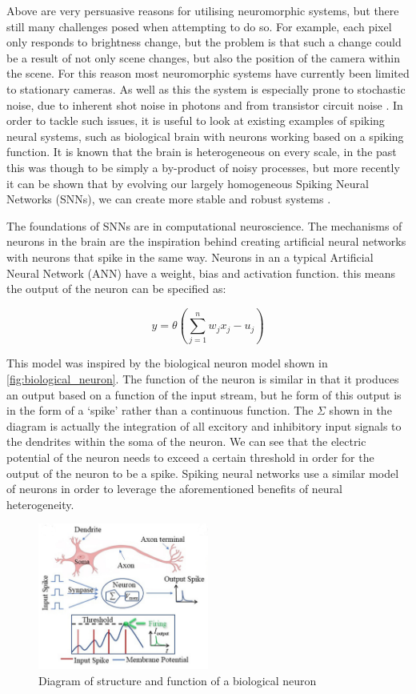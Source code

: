 Above are very persuasive reasons for utilising neuromorphic systems, but there still many challenges posed when attempting to do so. For example, each pixel only responds to brightness change, but the problem is that such a change could be a result of not only scene changes, but also the position of the camera within the scene. For this reason most neuromorphic systems have currently been limited to stationary cameras. As well as this the system is especially prone to stochastic noise, due to inherent shot noise in photons and from transistor circuit noise \cite{EventBasedVisionASurvery}. In order to tackle such issues, it is useful to look at existing examples of spiking neural systems, such as biological brain with neurons working based on a spiking function. It is known that the brain is heterogeneous on every scale, in the past this was though to be simply a by-product of noisy processes, but more recently it can be shown that by evolving our largely homogeneous Spiking Neural Networks (SNNs), we can create more stable and robust systems \cite{NeuralHetroPromRobLearn}.

The foundations of SNNs are in computational neuroscience. The mechanisms of neurons in the brain are the inspiration behind creating artificial neural networks with neurons that spike in the same way. Neurons in an a typical Artificial Neural Network (ANN) have a weight, bias and activation function. this means the output of the neuron can be specified as:

$$ y = \theta(\sum^n_{j=1}w_jx_j-u_j) $$

This model was inspired by the biological neuron model shown in \autoref{fig:biological_neuron}. The function of the neuron is similar in that it produces an output based on a function of the input stream, but he form of this output is in the form of a `spike' rather than a continuous function. The $ \Sigma $ shown in the diagram is actually the integration of all excitory and inhibitory input signals to the dendrites within the soma of the neuron. We can see that the electric potential of the neuron needs to exceed a certain threshold in order for the output of the neuron to be a spike. Spiking neural networks use a similar model of neurons in order to leverage the aforementioned benefits of neural heterogeneity.

\begin{figure}[htb]
      \centering
      \includegraphics[width=0.5\textwidth]{background/images/biological_neuron.png}
      \caption{Diagram of structure and function of a biological neuron \cite{BiologicalNeuronModel}}
      \label{fig:biological_neuron}
\end{figure}


